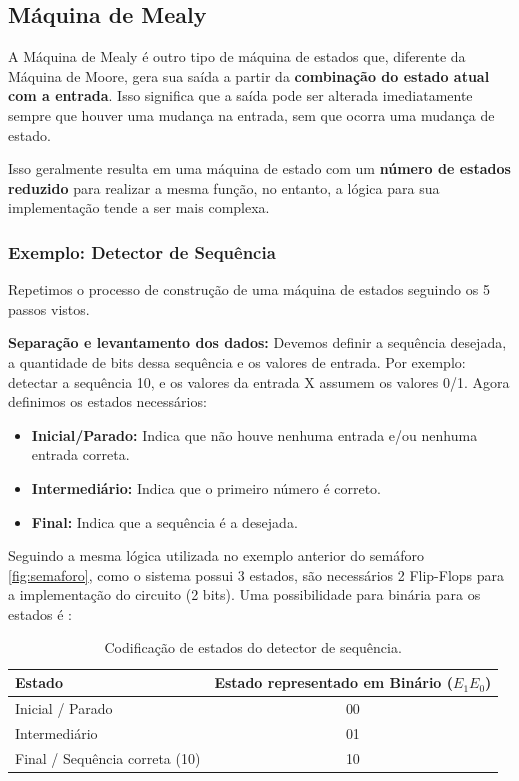 \documentclass[12pt]{article}
\begin{document}
\subsection{Máquina de Mealy}

A Máquina de Mealy é outro tipo de máquina de estados que, diferente da Máquina de Moore, gera sua saída a partir da \textbf{combinação do estado atual com a entrada}. Isso significa que a saída pode ser alterada imediatamente sempre que houver uma mudança na entrada, sem que ocorra uma mudança de estado.

Isso geralmente resulta em uma máquina de estado com um \textbf{número de estados reduzido} para realizar a mesma função, no entanto, a lógica para sua implementação tende a ser mais complexa.


\subsubsection{Exemplo: Detector de Sequência}
Repetimos o processo de construção de uma máquina de estados seguindo os 5 passos vistos.

\textbf{Separação e levantamento dos dados:}
Devemos definir a sequência desejada, a quantidade de bits dessa sequência e os valores de entrada.
Por exemplo: detectar a sequência 10, e os valores da entrada X assumem os valores 0/1. Agora definimos os estados necessários:

\begin{itemize}
    \item \textbf{Inicial/Parado:} Indica que não houve nenhuma entrada e/ou nenhuma entrada correta.
    \item \textbf{Intermediário:} Indica que o primeiro número é correto. 
    \item \textbf{Final:} Indica que a sequência é a desejada. 
\end{itemize}

Seguindo a mesma lógica utilizada no exemplo anterior do semáforo \ref{fig:semaforo}, como o sistema possui 3 estados, são necessários 2 Flip-Flops para a implementação do circuito (2 bits). Uma possibilidade para binária para os estados é :

\begin{table}[H] 
\centering 
\begin{tabular}{|l|c|} 
\hline
\textbf{Estado} & \textbf{Estado representado em Binário ($E_1$$E_0$)} \\ 
\hline
Inicial / Parado & 00 \\ 
Intermediário & 01 \\ 
Final / Sequência correta (10) & 10 \\ 
\hline 
\end{tabular} 
\caption{Codificação de estados do detector de sequência.} 
\end{table}
\end{document}
